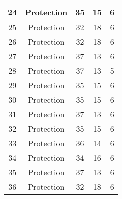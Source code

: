 \documentclass[results.tex]{subfiles}
\begin{document}
\begin{center}
\begin{tabular}{| c || c | c | c | c |}
            \hline
            24                      & Protection                   & 35                     & 15                      & 6                    \\
            \hline
            25                      & Protection                   & 32                     & 18                      & 6                    \\
            \hline
            26                      & Protection                   & 32                     & 18                      & 6                    \\
            \hline
            27                      & Protection                   & 37                     & 13                      & 6                    \\
            \hline
            28                      & Protection                   & 37                     & 13                      & 5                    \\
            \hline
            29                      & Protection                   & 35                     & 15                      & 6                    \\
            \hline
            30                      & Protection                   & 35                     & 15                      & 6                    \\
            \hline
            31                      & Protection                   & 37                     & 13                      & 6                    \\
            \hline
            32                      & Protection                   & 35                     & 15                      & 6                    \\
            \hline
            33                      & Protection                   & 36                     & 14                      & 6                    \\
            \hline
            34                      & Protection                   & 34                     & 16                      & 6                    \\
            \hline
            35                      & Protection                   & 37                     & 13                      & 6                    \\
            \hline
            36                      & Protection                   & 32                     & 18                      & 6                    \\

\end{tabular}
\end{center}
\end{document}
